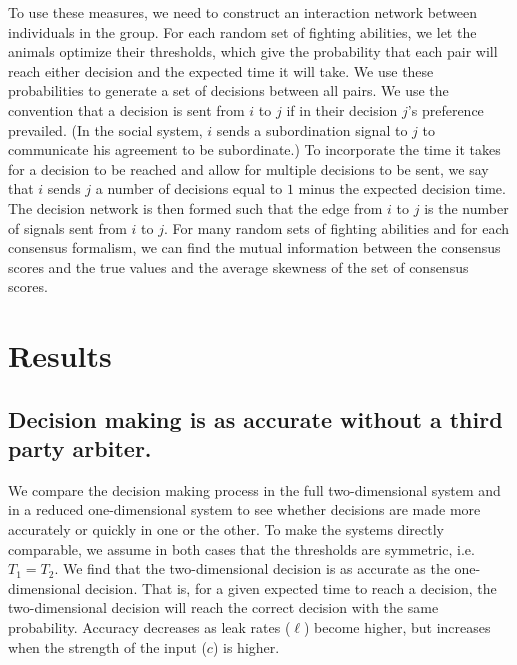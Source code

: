 \documentclass{article}
\begin{document}
To use these measures, we need to construct an interaction network between individuals in the group.  For each random set of fighting abilities, we let the animals optimize their thresholds, which give the probability that each pair will reach either decision and the expected time it will take.  We use these probabilities to generate a set of decisions between all pairs.  We use the convention that a decision is sent from $i$ to $j$ if in their decision $j$'s preference prevailed.  (In the social system, $i$ sends a subordination signal to $j$ to communicate his agreement to be subordinate.) To incorporate the time it takes for a decision to be reached and allow for multiple decisions to be sent, we say that $i$ sends $j$ a number of decisions equal to $1$ minus the expected decision time.  The decision network is then formed such that the edge from $i$ to $j$ is the number of signals sent from $i$ to $j$.  For many random sets of fighting abilities and for each consensus formalism, we can find the mutual information between the consensus scores and the true values and  the average skewness of the set of consensus scores.

\section{Results}
\subsection{Decision making is as accurate without a third party arbiter. }
We compare the decision making process in the full two-dimensional system and in a reduced one-dimensional system to see whether decisions are made more accurately or quickly in one or the other.  To make the systems directly comparable, we assume in both cases that the thresholds are symmetric, i.e. $T_1=T_2$.  We find that the two-dimensional decision is as accurate as the one-dimensional decision.  That is, for a given expected time to reach a decision, the two-dimensional decision will reach the correct decision with the same probability.  Accuracy decreases as leak rates ($\ell$) become higher, but increases when the strength of the input ($c$) is higher.
\end{document}
